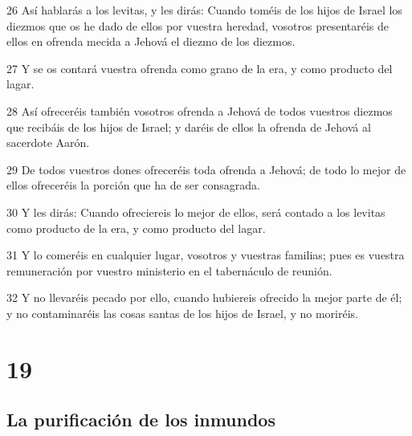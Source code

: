 \par 26 Así hablarás a los levitas, y les dirás: Cuando toméis de los hijos de Israel los diezmos que os he dado de ellos por vuestra heredad, vosotros presentaréis de ellos en ofrenda mecida a Jehová el diezmo de los diezmos.
\par 27 Y se os contará vuestra ofrenda como grano de la era, y como producto del lagar.
\par 28 Así ofreceréis también vosotros ofrenda a Jehová de todos vuestros diezmos que recibáis de los hijos de Israel; y daréis de ellos la ofrenda de Jehová al sacerdote Aarón.
\par 29 De todos vuestros dones ofreceréis toda ofrenda a Jehová; de todo lo mejor de ellos ofreceréis la porción que ha de ser consagrada.
\par 30 Y les dirás: Cuando ofreciereis lo mejor de ellos, será contado a los levitas como producto de la era, y como producto del lagar.
\par 31 Y lo comeréis en cualquier lugar, vosotros y vuestras familias; pues es vuestra remuneración por vuestro ministerio en el tabernáculo de reunión.
\par 32 Y no llevaréis pecado por ello, cuando hubiereis ofrecido la mejor parte de él; y no contaminaréis las cosas santas de los hijos de Israel, y no moriréis. 


\chapter{19}

\section*{La purificación de los inmundos}


